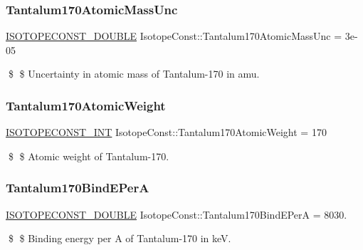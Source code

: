 \subsubsection{\texorpdfstring{Tantalum170\+Atomic\+Mass\+Unc}{Tantalum170AtomicMassUnc}}
{\footnotesize\ttfamily \mbox{\hyperlink{group___isotope_const-_macros_ga8f45a7272ce02c0b4c65c44636ed719a}{I\+S\+O\+T\+O\+P\+E\+C\+O\+N\+S\+T\+\_\+\+D\+O\+U\+B\+LE}} Isotope\+Const\+::\+Tantalum170\+Atomic\+Mass\+Unc = 3e-\/05}

\$ \$ Uncertainty in atomic mass of Tantalum-\/170 in amu. \mbox{\label{group___isotope_const-_tantalum-_ta170_ga120a4f2a2bd789f37589d0a5f54b95d3}} 
\subsubsection{\texorpdfstring{Tantalum170\+Atomic\+Weight}{Tantalum170AtomicWeight}}
{\footnotesize\ttfamily \mbox{\hyperlink{group___isotope_const-_macros_ga5f18360b3e99483a35c32d789e62621c}{I\+S\+O\+T\+O\+P\+E\+C\+O\+N\+S\+T\+\_\+\+I\+NT}} Isotope\+Const\+::\+Tantalum170\+Atomic\+Weight = 170}

\$ \$ Atomic weight of Tantalum-\/170. \mbox{\label{group___isotope_const-_tantalum-_ta170_ga69b7a22d815ff782311205377cd27190}} 
\subsubsection{\texorpdfstring{Tantalum170\+Bind\+E\+PerA}{Tantalum170BindEPerA}}
{\footnotesize\ttfamily \mbox{\hyperlink{group___isotope_const-_macros_ga8f45a7272ce02c0b4c65c44636ed719a}{I\+S\+O\+T\+O\+P\+E\+C\+O\+N\+S\+T\+\_\+\+D\+O\+U\+B\+LE}} Isotope\+Const\+::\+Tantalum170\+Bind\+E\+PerA = 8030.}

\$ \$ Binding energy per A of Tantalum-\/170 in keV. \mbox{\label{group___isotope_const-_tantalum-_ta170_ga915a5e30d38ddfbfb1c84648b6e57900}} 
